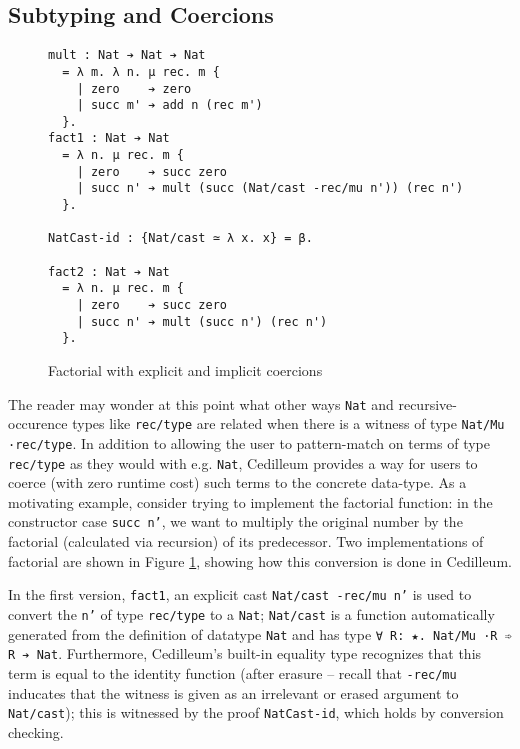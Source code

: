 \documentclass{article}
\begin{document}
\subsection{Subtyping and Coercions}
\label{sec:subtyping-coercion}
\begin{figure}[h]
\begin{verbatim}
mult : Nat ➔ Nat ➔ Nat
  = λ m. λ n. μ rec. m {
    | zero    ➔ zero
    | succ m' ➔ add n (rec m')
  }.
fact1 : Nat ➔ Nat
  = λ n. μ rec. m {
    | zero    ➔ succ zero
    | succ n' ➔ mult (succ (Nat/cast -rec/mu n')) (rec n')
  }.

NatCast-id : {Nat/cast ≃ λ x. x} = β.

fact2 : Nat ➔ Nat
  = λ n. μ rec. m {
    | zero    ➔ succ zero
    | succ n' ➔ mult (succ n') (rec n')
  }.
\end{verbatim}
  \caption{Factorial with explicit and implicit coercions}
  \label{fig:ex-data-fact}
\end{figure}

The reader may wonder at this point what other ways \texttt{Nat} and
recursive-occurence types like \texttt{rec/type} are related when there is a
witness of type \texttt{Nat/Mu ·rec/type}. In addition to allowing the user to
pattern-match on terms of type \texttt{rec/type} as they would with e.g.
\texttt{Nat}, Cedilleum provides a way for users to coerce (with zero runtime
cost) such terms to the concrete data-type. As a motivating example, consider
trying to implement the factorial function: in the constructor case \texttt{succ
n'}, we want to multiply the original number by the factorial (calculated via
recursion) of its predecessor. Two implementations of factorial are shown in
Figure \ref{fig:ex-data-fact}, showing how this conversion is done in Cedilleum.

In the first version, \texttt{fact1}, an explicit cast \texttt{Nat/cast -rec/mu n'} is used
to convert the \texttt{n'} of type \texttt{rec/type} to a \texttt{Nat};
\texttt{Nat/cast} is a function automatically generated from the definition of datatype
\texttt{Nat} and has type \texttt{∀ R: ★. Nat/Mu ·R ➾ R ➔ Nat}. Furthermore,
Cedilleum's built-in equality type recognizes that this term is equal to the
identity function (after erasure -- recall that \texttt{-rec/mu} inducates that
the witness is given as an irrelevant or erased argument to \texttt{Nat/cast});
this is witnessed by the proof \texttt{NatCast-id}, which holds by conversion
checking.
\end{document}
